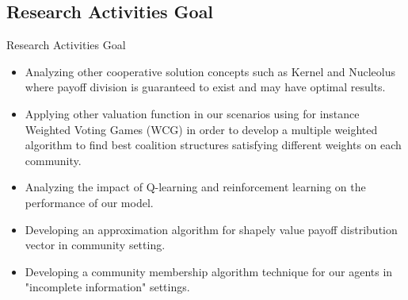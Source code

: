 \documentclass{beamer}
\begin{document}
\subsection{Research Activities Goal}
\begin{frame}{Research Activities Goal}
    \begin{itemize}
        \item Analyzing other cooperative solution concepts such as Kernel
        and Nucleolus where payoff division is guaranteed to exist and may
        have optimal results.

        \item Applying other valuation function in our scenarios using for
        instance Weighted Voting Games (WCG) in order to develop a
        multiple weighted algorithm to find best coalition structures
        satisfying different weights on each community.

        \item Analyzing the impact of Q-learning and reinforcement
        learning on the performance of our model.

        \item Developing an approximation algorithm for shapely value
        payoff distribution vector in community setting.

        \item Developing a community membership algorithm technique for
        our agents in "incomplete information" settings.

    \end{itemize}
\end{frame}

\end{document}
